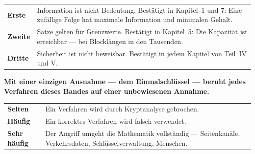 \begin{warnung}
\begin{center}
{\small
\renewcommand{\arraystretch}{1.5}
\begin{tabular}{@{}P{2.4cm}P{6.2cm}@{}}
\toprule
\textbf{Erste} & Information ist nicht Bedeutung. Bestätigt in Kapitel~1 und 7: Eine zufällige Folge hat maximale Information und minimalen Gehalt.\\
\textbf{Zweite} & Sätze gelten für Grenzwerte. Bestätigt in Kapitel~5: Die Kapazität ist erreichbar --- bei Blocklängen in den Tausenden.\\
\textbf{Dritte} & Sicherheit ist nicht beweisbar. Bestätigt in jedem Kapitel von Teil~IV und V.\\
\bottomrule
\end{tabular}}
\end{center}

\begin{center}
\begin{minipage}{0.9\textwidth}
\textbf{Mit einer einzigen Ausnahme --- dem Einmalschlüssel --- beruht jedes Verfahren dieses Bandes auf einer unbewiesenen Annahme.}
\end{minipage}
\end{center}

\begin{center}
\begin{minipage}{0.88\textwidth}
\end{minipage}
\end{center}

\begin{center}
{\small
\renewcommand{\arraystretch}{1.5}
\begin{tabular}{@{}P{2.4cm}P{6.2cm}@{}}
\toprule
\textbf{Selten} & Ein Verfahren wird durch Kryptanalyse gebrochen.\\
\textbf{Häufig} & Ein korrektes Verfahren wird falsch verwendet.\\
\textbf{Sehr häufig} & Der Angriff umgeht die Mathematik vollständig --- Seitenkanäle, Verkehrsdaten, Schlüsselverwaltung, Menschen.\\
\bottomrule
\end{tabular}}
\end{center}

\begin{center}
\begin{minipage}{0.88\textwidth}
\end{minipage}
\end{center}
\end{warnung}

